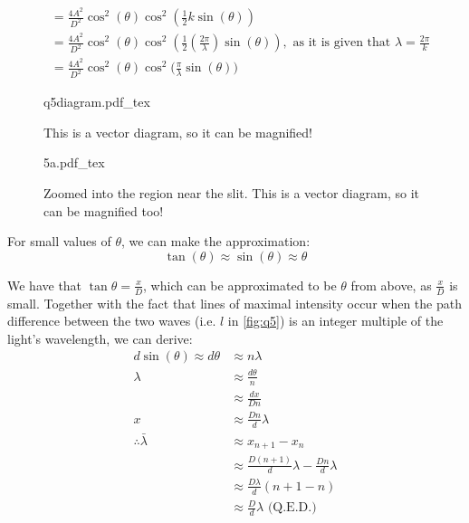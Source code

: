 \documentclass[a4paper, titlepage, DIV=14]{scrartcl}
\begin{document}
\begin{enumerate}
\begin{align*}
                &= \frac{4A^{2}}{D^{2}}\cos^{2}(\theta)\cos^{2}(\frac{1}{2}k\sin(\theta)) \\
                &= \frac{4A^{2}}{D^{2}}\cos^{2}(\theta)\cos^{2}(\frac{1}{2}(\frac{2\pi}{\lambda})
                \sin(\theta)), \text{ as it is given that } \lambda = \frac{2\pi}{k} \\
                &= \frac{4A^{2}}{D^{2}}\cos^{2}(\theta)\cos^{2}\biggr(\frac{\pi}{\lambda}
                \sin(\theta)\biggr)
        \end{align*}
        \begin{figure}[!h]
            \centering
            {q5diagram.pdf_tex}
            \caption{This is a vector diagram, so it can be magnified!}
            \label{fig:q5}
        \end{figure}
        
        
        \begin{figure}[!th]
            \centering
            {5a.pdf_tex}
            \caption{Zoomed into the region near the slit. This is a vector diagram, so it can be magnified too!}
            \label{fig:q5a}
        \end{figure}

        For small values of $\theta$, we can make the approximation:
        \begin{equation*}
            \tan(\theta) \approx \sin(\theta) \approx \theta
        \end{equation*}

        We have that $\tan{\theta}=\frac{x}{D}$, which can be approximated to be $\theta$ from above, as $\frac{x}{D}$
        is small. Together with the fact that lines of maximal intensity occur when the path difference between the two waves (i.e. $l$ in \autoref{fig:q5}) 
        is an integer multiple of the light's wavelength, we can derive:
        \begin{align*}
            d\sin(\theta) \approx d\theta &\approx n\lambda \\
            \lambda &\approx \frac{d\theta}{n} \\
                 &\approx \frac{dx}{Dn} \\
            x &\approx \frac{Dn}{d}\lambda \\
            \therefore \bar{\lambda} &\approx x_{n+1}-x_{n} \\
            &\approx \frac{D(n+1)}{d}\lambda - \frac{Dn}{d}\lambda \\
                                    &\approx \frac{D\lambda}{d} (n+1-n) \\
                                    &\approx \frac{D}{d}\lambda \text{ (Q.E.D.)}
        \end{align*}




    \end{enumerate}
\end{document}
